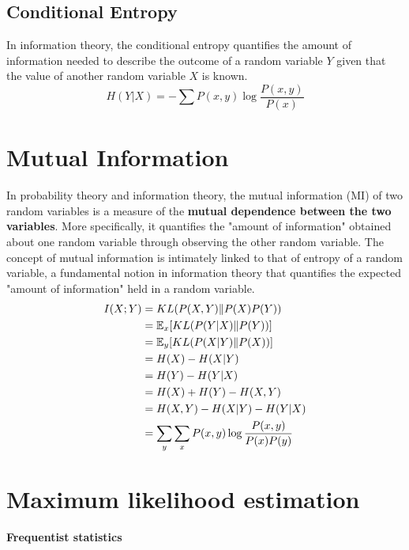 \subsection{Conditional Entropy}
In information theory, the conditional entropy quantifies the amount of information needed to describe the outcome of a random variable
$Y$ given that the value of another random variable $X$ is known.
\begin{equation}
    H(Y|X) = -\sum P(x, y) \log \frac{P(x, y)}{P(x)}
\end{equation}

\section{Mutual Information}
In probability theory and information theory, the mutual information (MI) of two random variables is a
measure of the \textbf{mutual dependence between the two variables}. More specifically, it quantifies the "amount of information"
obtained about one random variable through observing the other random variable. The concept of mutual information is
intimately linked to that of entropy of a random variable, a fundamental notion in information theory that quantifies
the expected "amount of information" held in a random variable.
\begin{equation}
    \begin{split}
        I(X;Y)
        &= KL(P(X,Y)\|P(X)P(Y)) \\
        &= \mathbb{E}_x[KL(P(Y|X)\|P(Y))] \\
        &= \mathbb{E}_y[KL(P(X|Y)\|P(X))] \\
        &= H(X) - H(X|Y) \\
        &= H(Y) - H(Y|X) \\
        &= H(X) + H(Y) - H(X, Y) \\
        &= H(X, Y) - H(X|Y) - H(Y|X) \\
        &= \sum_y\sum_x P(x, y) \log \frac{P(x, y)}{P(x)P(y)}
    \end{split}
\end{equation}


\section{Maximum likelihood estimation}
\textbf{Frequentist statistics}

